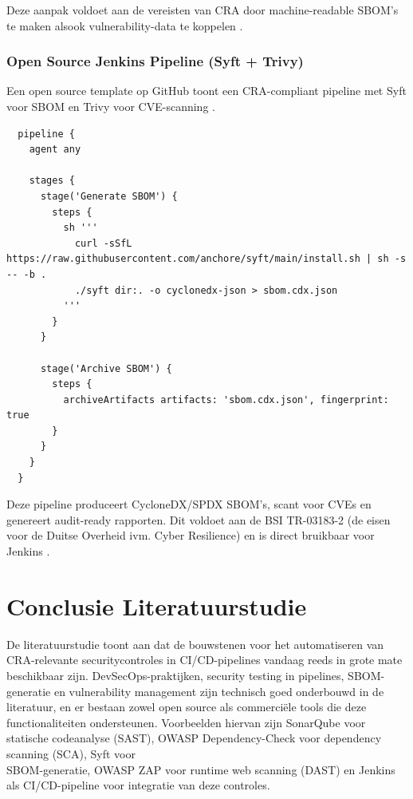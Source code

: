 Deze aanpak voldoet aan de vereisten van CRA door machine-readable SBOM's te maken alsook vulnerability-data te koppelen \autocite{RedHatPipeline}.

\subsubsection{Open Source Jenkins Pipeline (Syft + Trivy)}

Een open source template op GitHub toont een CRA-compliant pipeline met Syft voor SBOM en Trivy voor CVE-scanning \autocite{CRAEvidencePipeline}.

\begin{listing}[h]
  \caption{SBOM-generatie pipeline (Syft + archiveren)}
  \label{lst:pipeline-syft}
  \begin{verbatim}
  pipeline {
    agent any
  
    stages {
      stage('Generate SBOM') {
        steps {
          sh '''
            curl -sSfL https://raw.githubusercontent.com/anchore/syft/main/install.sh | sh -s -- -b .
            ./syft dir:. -o cyclonedx-json > sbom.cdx.json
          '''
        }
      }
  
      stage('Archive SBOM') {
        steps {
          archiveArtifacts artifacts: 'sbom.cdx.json', fingerprint: true
        }
      }
    }
  }
  \end{verbatim}
\end{listing}

Deze pipeline produceert CycloneDX/SPDX SBOM's, scant voor CVEs en genereert audit-ready rapporten. Dit voldoet aan de BSI TR-03183-2 (de eisen voor de Duitse Overheid ivm. Cyber Resilience) en is direct bruikbaar voor Jenkins \autocite{CRAEvidencePipeline}. 

\section{Conclusie Literatuurstudie}

De literatuurstudie toont aan dat de bouwstenen voor het automatiseren van CRA-relevante securitycontroles in CI/CD-pipelines vandaag reeds in grote mate beschikbaar zijn. DevSecOps-praktijken, security testing in pipelines, SBOM-generatie en vulnerability management zijn technisch goed onderbouwd in de literatuur, en er bestaan zowel open source als commerciële tools die deze functionaliteiten ondersteunen. Voorbeelden hiervan zijn SonarQube voor statische codeanalyse (SAST), OWASP Dependency-Check voor dependency scanning (SCA), Syft voor \\SBOM-generatie, OWASP ZAP voor runtime web scanning (DAST) en Jenkins als CI/CD-pipeline voor integratie van deze controles.

